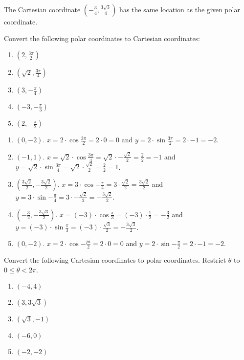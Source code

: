 The Cartesian coordinate $(-\frac{3}{4}, \frac{3\sqrt{3}}{4})$ has the 
same location as the given polar coordinate. 

\begin{Exercise}[label = convert1]
Convert the following polar coordinates to Cartesian coordinates: 
\begin{enumerate}
\item $(2, \frac{3\pi}{2})$
\item $(\sqrt{2}, \frac{3\pi}{4})$
\item $(3, -\frac{\pi}{4})$
\item $(-3, -\frac{\pi}{3})$
\item $(2, -\frac{\pi}{2})$
\end{enumerate}
\end{Exercise}

\begin{Answer}[ref = convert1]
\begin{enumerate}
\item $(0, -2)$. $x = 2 \cdot \cos{\frac{3\pi}{2}} = 2 \cdot 0 = 0$ and $y = 2 
\cdot \sin{\frac{3\pi}{2}} = 2 \cdot -1 = -2$.
\item $(-1,1)$. $x = \sqrt{2} \cdot \cos{\frac{3\pi}{4}} = \sqrt{2} \cdot - 
\frac{\sqrt{2}}{2} = \frac{2}{2} = -1$ and $y = \sqrt{2} \cdot \sin{\frac{3
\pi}{4}} = \sqrt{2} \cdot \frac{\sqrt{2}}{2} = \frac{2}{2} = 1$. 
\item $(\frac{3\sqrt{2}}{2}, -\frac{3\sqrt{2}}{2})$. $x = 3 \cdot \cos{-\frac{
\pi}{4}} = 3 \cdot \frac{\sqrt{2}}{2} = \frac{3\sqrt{2}}{2}$ and $y = 3 \cdot 
\sin{-\frac{\pi}{4}} = 3 \cdot -\frac{\sqrt{2}}{2} = -\frac{3\sqrt{2}}{2}$.
\item $(-\frac{3}{2}, -\frac{3\sqrt{3}}{2})$. $x = (-3) \cdot \cos{\frac{\pi}{3
}} = (-3) \cdot \frac{1}{2} = -\frac{3}{2}$ and $y = (-3) \cdot \sin{\frac{\pi
}{3}} = (-3) \cdot \frac{\sqrt{3}}{2} = - \frac{3\sqrt{3}}{2}$.
\item $(0, -2)$. $x = 2 \cdot \cos{-\frac{pi}{2}} = 2 \cdot 0 = 0$ and $y = 2 
\cdot \sin{-\frac{\pi}{2}} = 2 \cdot -1 = -2$. 
\end{enumerate}
\end{Answer}

\begin{Exercise}[label = convert2]
Convert the following Cartesian coordinates to polar coordinates. Restrict 
$\theta$ to $0 \leq \theta < 2\pi$. 
\begin{enumerate}
\item $(-4, 4)$
\item $(3, 3\sqrt{3})$
\item $(\sqrt{3}, -1)$
\item $(-6, 0)$
\item $(-2, -2)$
\end{enumerate}
\end{Exercise}

